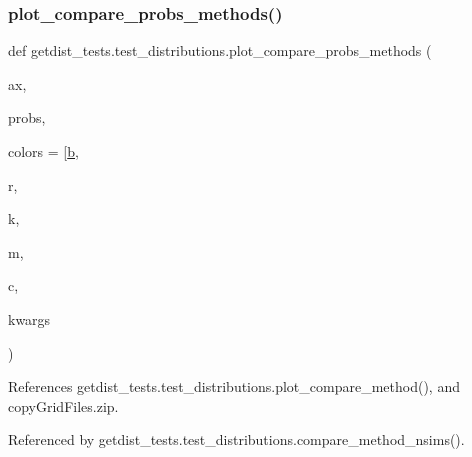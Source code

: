 \subsubsection{\texorpdfstring{plot\+\_\+compare\+\_\+probs\+\_\+methods()}{plot\_compare\_probs\_methods()}}
{\footnotesize\ttfamily def getdist\+\_\+tests.\+test\+\_\+distributions.\+plot\+\_\+compare\+\_\+probs\+\_\+methods (\begin{DoxyParamCaption}\item[{}]{ax,  }\item[{}]{probs,  }\item[{}]{colors = {\ttfamily \mbox{[}\textquotesingle{}\mbox{\hyperlink{plotTT_8m_ac0431efac4d7c393d1e70b86115cb93f}{b}}\textquotesingle{}},  }\item[{}]{r,  }\item[{}]{k,  }\item[{}]{m,  }\item[{}]{c,  }\item[{}]{kwargs }\end{DoxyParamCaption})}



References getdist\+\_\+tests.\+test\+\_\+distributions.\+plot\+\_\+compare\+\_\+method(), and copy\+Grid\+Files.\+zip.



Referenced by getdist\+\_\+tests.\+test\+\_\+distributions.\+compare\+\_\+method\+\_\+nsims().

